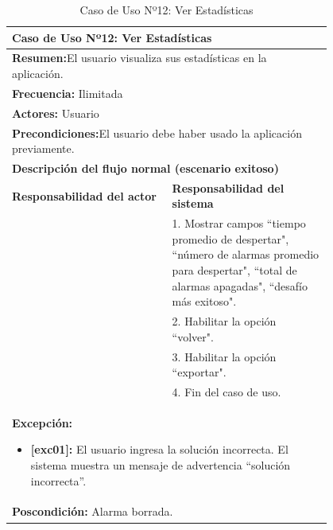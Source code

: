 \begin{table}[H]
    \centering
    \caption{Caso de Uso Nº12: Ver Estadísticas}
    
    \begin{tabular}{| p{0.4\linewidth} | p{0.4\linewidth} |}
        \hline
        \multicolumn{2}{|l|}{\textbf{Caso de Uso Nº12:} Ver Estadísticas} \\
        \hline
        \multicolumn{2}{|l|}{\textbf{Resumen:}El usuario visualiza sus estadísticas en la aplicación.} \\
        \hline
        \multicolumn{2}{|l|}{\textbf{Frecuencia:}  Ilimitada} \\
        \hline
        \multicolumn{2}{|l|}{\textbf{Actores:}  Usuario} \\
        \hline
        \multicolumn{2}{|l|}{\textbf{Precondiciones:}El usuario debe haber usado la aplicación previamente.} \\
        \hline
        \multicolumn{2}{|l|}{\textbf{Descripción del flujo normal (escenario exitoso)} } \\
        \hline
        \textbf{Responsabilidad del actor} & \textbf{Responsabilidad del sistema}\\
            & 1. Mostrar campos ``tiempo promedio de despertar", ``número de alarmas promedio para despertar", ``total de alarmas apagadas", ``desafío más exitoso".\\
            & 2. Habilitar la opción ``volver". \\
            & 3. Habilitar la opción ``exportar".\\
            & 4. Fin del caso de uso. \\
        \hline
        \multicolumn{2}{|p{0.8\linewidth}|}{
                \textbf{Excepción:}
                \begin{itemize}
                    \item \textbf{[exc01]:} El usuario ingresa la solución incorrecta. El sistema muestra un mensaje de advertencia ``solución incorrecta”.
                \end{itemize}}\\
        \hline
        \multicolumn{2}{|l|}{\textbf{Poscondición:}  Alarma borrada.} \\
        \hline
    \end{tabular}

    \label{table:12}
\end{table}